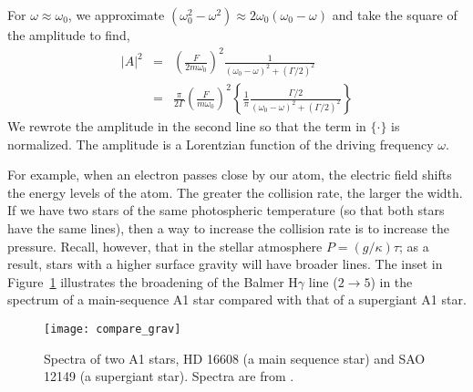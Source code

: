 \begin{sidebar}
For $\omega \approx \omega_0$, we approximate $(\omega_0^2-\omega^2)\approx 2\omega_0(\omega_0-\omega)$ and take the square of the amplitude to find,
\begin{eqnarray}
    \left|A\right|^2 &=& \left(\frac{F}{2m\omega_0}\right)^2
        \frac{1}{(\omega_0-\omega)^2 + (\Gamma/2)^2}\nonumber\\
    &=& \frac{\pi}{2\Gamma}\left(\frac{F}{m\omega_0}\right)^2
        \left\{\frac{1}{\pi}\frac{\Gamma/2}{(\omega_0-\omega)^2 + (\Gamma/2)^2}\right\}
\end{eqnarray}
We rewrote the amplitude in the second line so that the term in $\{\cdot\}$ is normalized. The amplitude is a Lorentzian function of the driving frequency $\omega$.
\end{sidebar} 

 For example, when an electron passes close by our atom, the electric field shifts the energy levels of the atom.  The greater the collision rate, the larger the width.
If we have two stars of the same photospheric temperature (so that both stars have the same lines), then a way to increase the collision rate is to increase the pressure. Recall, however, that in the stellar atmosphere $P = (g/\kappa)\tau$; as a result, stars with a higher surface gravity will have broader lines. The inset in Figure~\ref{f.compare_grav} illustrates the broadening of the Balmer H$\gamma$ line ($2\to5$) in the spectrum of a main-sequence A1 star compared with that of a supergiant A1 star.

\begin{figure}[hp]
    \texttt{[image: compare\_grav]}
    \caption[Spectra of two A1 stars]{\label{f.compare_grav}
    Spectra of two A1 stars, HD 16608 (a main sequence star) and SAO 12149 (a supergiant star).  Spectra are from \citet{Jacoby1984A-library-of-st}.
    }
\end{figure}

